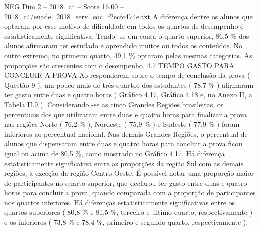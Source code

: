 \begin{textsample}{NEG Dim 2 – 2018\_c4 – Score 16.00 – 2018\_c4/enade\_2018\_serv\_soc\_f2ecfc474e.txt}
A diferença dentre os alunos que optaram por esse motivo de dificuldade em todos os quartos de desempenho é estatisticamente significativa.
Tendo -se em conta o quarto superior, 86,5 \% dos alunos afirmaram ter estudado e aprendido muitos ou todos os conteúdos.
No outro extremo, no primeiro quarto, 49,1 \% optaram pelas mesmas categorias.
As proporções são crescentes com o desempenho. 4.7 TEMPO GASTO PARA CONCLUIR A PROVA Ao responderem sobre o tempo de conclusão da prova ( Questão 9 ), um pouco mais de três quartos dos estudantes ( 78,7 \% ) afirmaram ter gasto entre duas e quatro horas ( Gráfico 4.17, Gráfico 4.18 e, no Anexo II, a Tabela II.9 ).
Considerando -se as cinco Grandes Regiões brasileiras, os percentuais dos que utilizaram entre duas e quatro horas para finalizar a prova nas regiões Norte ( 76,2 \% ), Nordeste ( 75,9 \% ) e Sudeste ( 77,9 \% ) foram inferiores ao percentual nacional.
Nas demais Grandes Regiões, o percentual de alunos que dispensaram entre duas e quatro horas para concluir a prova ficou igual ou acima de 80,5 \%, como mostrado no Gráfico 4.17.
Há diferença estatisticamente significativa entre as proporções da região Sul com as demais regiões, à exceção da região Centro-Oeste.
É possível notar uma proporção maior de participantes no quarto superior, que declarou ter gasto entre duas e quatro horas para concluir a prova, quando comparada com a proporção de participantes nos quartos inferiores.
Há diferenças estatisticamente significativas entre os quartos superiores ( 80,8 \% e 81,5 \%, terceiro e último quarto, respectivamente ) e os inferiores ( 73,8 \% e 78,4 \%, primeiro e segundo quarto, respectivamente ).

\end{textsample}
